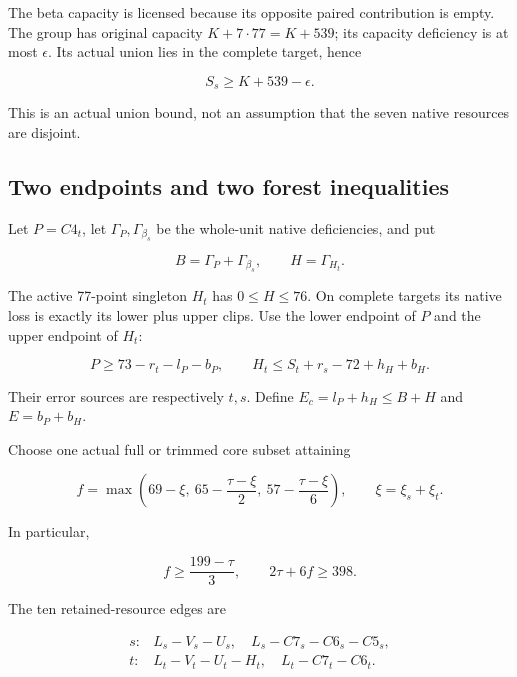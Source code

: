 \documentclass[10pt,a4paper]{article}
\theoremstyle{definition}
\begin{document}
The beta capacity is licensed because its opposite paired contribution
is empty. The group has original capacity \(K+\allowbreak{}7\cdot77=\allowbreak{}K+\allowbreak{}539\); its
capacity deficiency is at most \(\epsilon\). Its actual union lies in
the complete target,\allowbreak{} hence

\[
S_s\ge K+\allowbreak{}539-\epsilon.\tag{1}
\]

This is an actual union bound,\allowbreak{} not an assumption that the seven native
resources are disjoint.

\hypertarget{two-endpoints-and-two-forest-inequalities}{%
\subsection{Two endpoints and two forest
inequalities}\label{two-endpoints-and-two-forest-inequalities}}

Let \(P=\allowbreak{}C4_t\),\allowbreak{} let \(\Gamma_P,\allowbreak{}\Gamma_{\beta_s}\) be the whole-unit
native deficiencies,\allowbreak{} and put

\[
B=\allowbreak{}\Gamma_P+\allowbreak{}\Gamma_{\beta_s},\allowbreak{}\qquad H=\allowbreak{}\Gamma_{H_t}.
\]

The active 77-point singleton \(H_t\) has \(0\le H\le76\). On complete
targets its native loss is exactly its lower plus upper clips. Use the
lower endpoint of \(P\) and the upper endpoint of \(H_t\):

\[
P\ge73-r_t-l_P-b_P,\allowbreak{}\qquad
H_t\le S_t+\allowbreak{}r_s-72+\allowbreak{}h_H+\allowbreak{}b_H.
\]

Their error sources are respectively \(t,\allowbreak{}s\). Define
\(E_c=\allowbreak{}l_P+\allowbreak{}h_H\le B+\allowbreak{}H\) and \(E=\allowbreak{}b_P+\allowbreak{}b_H\).

Choose one actual full or trimmed core subset attaining

\[
f=\allowbreak{}\max\left(69-\xi,\allowbreak{}\ 65-\frac{\tau-\xi}{2},\allowbreak{}\ 57-\frac{\tau-\xi}{6}\right),\allowbreak{}
\qquad\xi=\allowbreak{}\xi_s+\allowbreak{}\xi_t.
\]

In particular,\allowbreak{}

\[
f\ge\frac{199-\tau}{3},\allowbreak{}\qquad 2\tau+\allowbreak{}6f\ge398.\tag{2}
\]

The ten retained-resource edges are

\[
\begin{array}{ll}
s:& L_s-V_s-U_s,\allowbreak{}\quad L_s-C7_s-C6_s-C5_s,\allowbreak{}\\
t:& L_t-V_t-U_t-H_t,\allowbreak{}\quad L_t-C7_t-C6_t.
\end{array}
\]
\end{document}
